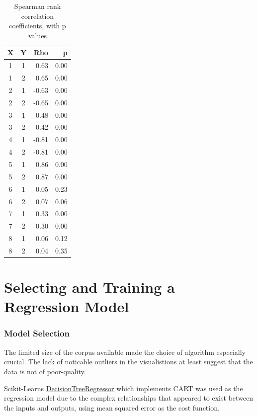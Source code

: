 \documentclass[12pt]{article}
\begin{document}
\begin{table}[!ht]
\centering
\begin{tabular}{||c|c|r|r||}
\hline
X    				& Y & Rho   & p    \\
\hline
1                   & 1 & 0.63  & 0.00 \\
1                   & 2 & 0.65  & 0.00 \\
2                   & 1 & -0.63 & 0.00 \\
2                   & 2 & -0.65 & 0.00 \\
3                   & 1 & 0.48  & 0.00 \\
3                   & 2 & 0.42  & 0.00 \\
4                   & 1 & -0.81 & 0.00 \\
4                   & 2 & -0.81 & 0.00 \\
5                   & 1 & 0.86  & 0.00 \\
5                   & 2 & 0.87  & 0.00 \\
6                   & 1 & 0.05  & 0.23 \\%
6                   & 2 & 0.07  & 0.06 \\
7                   & 1 & 0.33  & 0.00 \\
7                   & 2 & 0.30  & 0.00 \\
8                   & 1 & 0.06  & 0.12 \\
8                   & 2 & 0.04  & 0.35 \\
\hline
\end{tabular}
\caption{Spearman rank correlation coefficients, with p values}
\label{tbl:spearman-table}
\end{table}

\part{Selecting and Training a Regression Model}

\section{Model Selection}
The limited size of the corpus available made the choice of algorithm especially crucial. The lack of noticable outliers in the visualistions at least suggest that the data is not of poor-quality. 

Scikit-Learns \url{DecisionTreeRegressor} \cite{scikitlearntree} which implements CART was used as the regression model due to the complex relationships that appeared to exist between the inputs and outputs, using mean squared error as the cost function.
\end{document}
